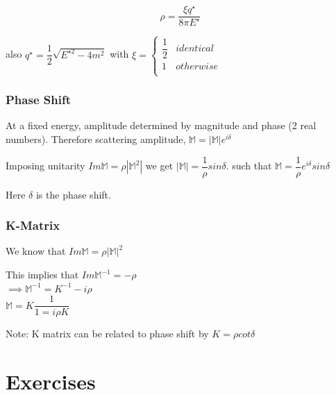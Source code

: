 \documentclass[a4paper]{article}
\begin{document}
\[
    \rho = \dfrac{\xi q^{\star}}{8\pi E^{\star}}
\]

also $q^{\star}=\dfrac{1}{2}\sqrt{E^{\star 2} - 4m^2}$ with $\xi = \begin{cases}
    \dfrac{1}{2} & identical \\
    1 & otherwise\\
\end{cases}$

\subsubsection{Phase Shift}
At a fixed energy, amplitude determined by magnitude and phase (2 real numbers). Therefore scattering amplitude, $\mathbb{M} = |\mathbb{M}|e^{i \delta}$

Imposing unitarity $Im \mathbb{M} = \rho |\mathbb{M}^{2}|$ we get $|\mathbb{M}| = \dfrac{1}{\rho} sin\delta$.
such that $\mathbb{M} = \dfrac{1}{\rho}e^{i \delta} sin \delta$ 

Here $\delta$ is the phase shift.

\subsubsection{K-Matrix}
We know that $Im \mathbb{M} = \rho|\mathbb{M}|^2$

This implies that $Im \mathbb{M}^{-1} = - \rho$ 
\\
$\implies \mathbb{M}^{-1} = K^{-1} - i \rho$
\\
$\mathbb{M} = K\dfrac{1}{1=i\rho K}$

Note: K matrix can be related to phase shift by $K = \rho cot \delta$


\section{Exercises}
\end{document}
